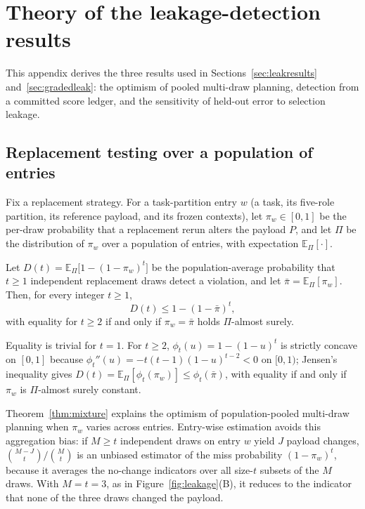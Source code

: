 
\section{Theory of the leakage-detection results}\label{app:theory}

This appendix derives the three results used in Sections~\ref{sec:leakresults} and~\ref{sec:gradedleak}: the optimism of pooled multi-draw planning, detection from a committed score ledger, and the sensitivity of held-out error to selection leakage.

\subsection{Replacement testing over a population of entries}

Fix a replacement strategy. For a task-partition entry \(w\) (a task, its five-role partition, its reference payload, and its frozen contexts), let \(\pi_w\in[0,1]\) be the per-draw probability that a replacement rerun alters the payload \(P\), and let \(\Pi\) be the distribution of \(\pi_w\) over a population of entries, with expectation \(\mathbb E_\Pi[\cdot]\).

\begin{theorem}\label{thm:mixture}
Let \(D(t)=\mathbb E_{\Pi}\big[1-(1-\pi_w)^t\big]\) be the population-average probability that \(t\ge1\) independent replacement draws detect a violation, and let \(\bar\pi=\mathbb E_\Pi[\pi_w]\). Then, for every integer \(t\ge1\),
\begin{equation}\label{eq:jensengap}
D(t)\le 1-(1-\bar\pi)^t,
\end{equation}
with equality for \(t\ge2\) if and only if \(\pi_w=\bar\pi\) holds \(\Pi\)-almost surely.
\end{theorem}

\begin{pf}
Equality is trivial for \(t=1\). For \(t\ge2\), \(\phi_t(u)=1-(1-u)^t\) is strictly concave on \([0,1]\) because \(\phi_t''(u)=-t(t-1)(1-u)^{t-2}<0\) on \([0,1)\); Jensen's inequality gives \(D(t)=\mathbb E_\Pi[\phi_t(\pi_w)]\le\phi_t(\bar\pi)\), with equality if and only if \(\pi_w\) is \(\Pi\)-almost surely constant.
\end{pf}

Theorem~\ref{thm:mixture} explains the optimism of population-pooled multi-draw planning when \(\pi_w\) varies across entries. Entry-wise estimation avoids this aggregation bias: if \(M\ge t\) independent draws on entry \(w\) yield \(J\) payload changes, \(\binom{M-J}{t}/\binom{M}{t}\) is an unbiased estimator of the miss probability \((1-\pi_w)^t\), because it averages the no-change indicators over all size-\(t\) subsets of the \(M\) draws. With \(M=t=3\), as in Figure~\ref{fig:leakage}(B), it reduces to the indicator that none of the three draws changed the payload.

